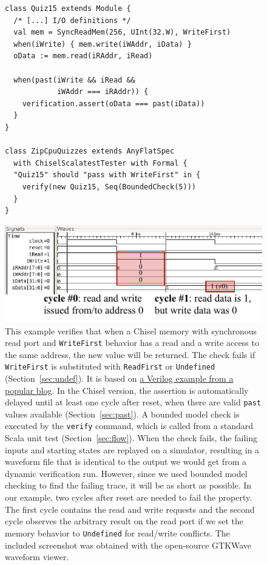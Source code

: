 \documentclass[conference]{IEEEtran}
\newcommand\scalainline[1]{\texttt{#1}}
\begin{document}
\begin{figure}
    \centering
\begin{verbatim}
class Quiz15 extends Module {
  /* [...] I/O definitions */
  val mem = SyncReadMem(256, UInt(32.W), WriteFirst)
  when(iWrite) { mem.write(iWAddr, iData) }
  oData := mem.read(iRAddr, iRead)

  when(past(iWrite && iRead &&
            iWAddr === iRAddr)) {
    verification.assert(oData === past(iData))
  }
}

class ZipCpuQuizzes extends AnyFlatSpec
  with ChiselScalatestTester with Formal {
  "Quiz15" should "pass with WriteFirst" in {
    verify(new Quiz15, Seq(BoundedCheck(5)))
  }
}
\end{verbatim}
\includegraphics{woset_2021_quiz15.pdf}
\caption[Chisel verification example.]{This example verifies that when a Chisel memory with synchronous read port and
\scalainline{WriteFirst} behavior has a read and a write access to the same address,
the new value will be returned.
The check fails if \scalainline{WriteFirst} is substituted with \scalainline{ReadFirst} or \scalainline{Undefined} (Section~\ref{sec:undef}).
It is based on \href{https://zipcpu.com/answer/2021/07/03/fv-answer15.html}{a Verilog example from a popular blog}.
In the Chisel version, the assertion is automatically delayed until at least one cycle after reset, when there are valid \scalainline{past} values available
(Section~\ref{sec:past}).
A bounded model check is executed by the \scalainline{verify} command, which is called from a standard Scala unit test (Section~\ref{sec:flow}).
When the check fails, the failing inputs and starting states are replayed on a simulator, resulting in a waveform file that is identical
to the output we would get from a dynamic verification run.
However, since we used bounded model checking to find the failing trace, it will be as short as possible.
In our example, two cycles after reset are needed to fail the property.
The first cycle contains the read and write requests and the second cycle observes the arbitrary result on the read port if
we set the memory behavior to \scalainline{Undefined} for read/write conflicts.
The included screenshot was obtained with the open-source GTKWave waveform viewer.
}
\label{fig:quiz15}
\end{figure}
\end{document}
